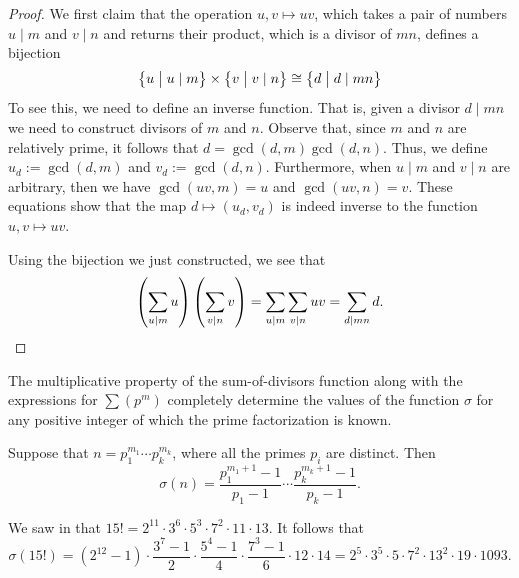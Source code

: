 \begin{proof}
  We first claim that the operation $u,v\mapsto uv$, which takes a pair of numbers $u\mid m$ and $v\mid n$ and returns their product, which is a divisor of $mn$, defines a bijection
  \begin{equation*}
    \big\{u\bigm\vert u\mid m\big\}\times\big\{v\bigm\vert v\mid n\big\}\cong
    \big\{d \bigm\vert d\mid mn\big\}
  \end{equation*}
  To see this, we need to define an inverse function. That is, given a divisor $d\mid mn$ we need to construct divisors of $m$ and $n$. Observe that, since $m$ and $n$ are relatively prime, it follows that $d=\gcd(d,m)\gcd(d,n)$. Thus, we define $u_d:=\gcd(d,m)$ and $v_d:=\gcd(d,n)$. Furthermore, when $u\mid m$ and $v\mid n$ are arbitrary, then we have $\gcd(uv,m)=u$ and $\gcd(uv,n)=v$. These equations show that the map $d\mapsto (u_d,v_d)$ is indeed inverse to the function $u,v\mapsto uv$.

  Using the bijection we just constructed, we see that
  \begin{equation*}
    \left(\sum_{u\mid m}u\right)\left(\sum_{v\mid n}v\right)=\sum_{u\mid m}\sum_{v\mid n} uv = \sum_{d\mid mn} d.\qedhere
  \end{equation*}
\end{proof}

The multiplicative property of the sum-of-divisors function along with the expressions for $\sum(p^m)$ completely determine the values of the function $\sigma$ for any positive integer of which the prime factorization is known.

\begin{corollary}
  Suppose that $n=p_1^{m_1}\cdots p_k^{m_k}$, where all the primes $p_i$ are distinct. Then
  \begin{equation*}
    \sigma(n)=\frac{p_1^{m_1+1}-1}{p_1-1}\cdots \frac{p_k^{m_k+1}-1}{p_k-1}.
  \end{equation*}
\end{corollary}

\begin{example}
  We saw in  that $15!=2^{11}{\cdot} 3^6{\cdot} 5^3{\cdot} 7^2 {\cdot} 11{\cdot} 13$. It follows that
  \begin{equation*}
    \sigma(15!)=(2^{12}-1){\cdot} \frac{3^7-1}{2}{\cdot} \frac{5^4-1}{4}{\cdot} \frac{7^3-1}{6}{\cdot} 12{\cdot} 14=2^5{\cdot} 3^5{\cdot} 5{\cdot} 7^2 {\cdot} 13^2{\cdot} 19{\cdot} 1093.
  \end{equation*}
\end{example}

